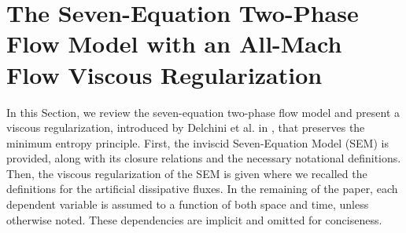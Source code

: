 \documentclass[preprint,10pt]{elsarticle}
\begin{document}
\section{The Seven-Equation Two-Phase Flow Model with an All-Mach Flow Viscous Regularization}\label{sec:7-equ-model}
%
 

In this Section, we review the seven-equation two-phase flow model \cite{SEM} and present a viscous regularization, introduced by Delchini et al. in \cite{Marco_paper_sem},
that preserves the minimum entropy principle.  
First, the inviscid Seven-Equation Model (SEM) is provided, along with its closure relations and the necessary notational definitions. 
Then, the viscous regularization of the SEM is given where we recalled the definitions for the artificial dissipative fluxes.
In the remaining of the paper, each dependent variable is assumed to a function of both space and time, unless otherwise noted. These dependencies are implicit and omitted for conciseness. 
%
\end{document}
